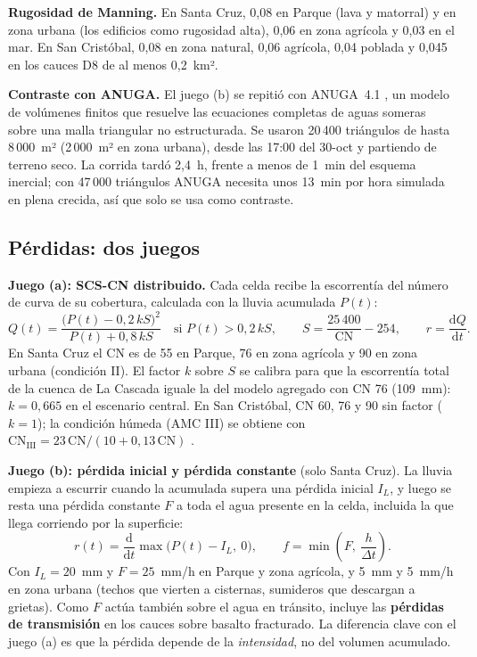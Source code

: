 \documentclass{sosg-informe}
\begin{document}
\textbf{Rugosidad de Manning.} En Santa Cruz, 0,08 en Parque (lava y matorral) y en zona urbana (los edificios como rugosidad alta), 0,06 en zona agrícola y 0,03 en el mar. En San Cristóbal, 0,08 en zona natural, 0,06 agrícola, 0,04 poblada y 0,045 en los cauces D8 de al menos 0,2~km².

\textbf{Contraste con ANUGA.} El juego (b) se repitió con ANUGA~4.1 \citep{anuga}, un modelo de volúmenes finitos que resuelve las ecuaciones completas de aguas someras sobre una malla triangular no estructurada. Se usaron 20\,400 triángulos de hasta 8\,000~m² (2\,000~m² en zona urbana), desde las 17:00 del 30-oct y partiendo de terreno seco. La corrida tardó 2,4~h, frente a menos de 1~min del esquema inercial; con 47\,000 triángulos ANUGA necesita unos 13~min por hora simulada en plena crecida, así que solo se usa como contraste.

\subsection{Pérdidas: dos juegos}\label{sec:perdidas}
\textbf{Juego (a): SCS-CN distribuido.} Cada celda recibe la escorrentía del número de curva \citep{usda1986} de su cobertura, calculada con la lluvia acumulada $P(t)$:
\begin{equation}
  Q(t) = \frac{\bigl(P(t) - 0,2\,kS\bigr)^2}{P(t) + 0,8\,kS}\quad \text{si } P(t) > 0,2\,kS, \qquad S = \frac{25\,400}{\mathrm{CN}} - 254, \qquad r = \frac{\mathrm{d}Q}{\mathrm{d}t}.
\end{equation}
En Santa Cruz el CN es de 55 en Parque, 76 en zona agrícola y 90 en zona urbana (condición II). El factor $k$ sobre $S$ se calibra para que la escorrentía total de la cuenca de La Cascada iguale la del modelo agregado con CN 76 (109~mm): $k = 0,665$ en el escenario central. En San Cristóbal, CN 60, 76 y 90 sin factor ($k = 1$); la condición húmeda (AMC III) se obtiene con $\mathrm{CN}_{\mathrm{III}} = 23\,\mathrm{CN}/(10 + 0,13\,\mathrm{CN})$ \citep{chow1988}.

\textbf{Juego (b): pérdida inicial y pérdida constante} (solo Santa Cruz). La lluvia empieza a escurrir cuando la acumulada supera una pérdida inicial $I_L$, y luego se resta una pérdida constante $F$ a toda el agua presente en la celda, incluida la que llega corriendo por la superficie:
\begin{equation}
  r(t) = \frac{\mathrm{d}}{\mathrm{d}t}\max\bigl(P(t) - I_L,\ 0\bigr), \qquad f = \min\!\left(F,\ \frac{h}{\Delta t}\right).
\end{equation}
Con $I_L = 20$~mm y $F = 25$~mm/h en Parque y zona agrícola, y 5~mm y 5~mm/h en zona urbana (techos que vierten a cisternas, sumideros que descargan a grietas). Como $F$ actúa también sobre el agua en tránsito, incluye las \textbf{pérdidas de transmisión} en los cauces sobre basalto fracturado. La diferencia clave con el juego (a) es que la pérdida depende de la \emph{intensidad}, no del volumen acumulado.
\end{document}
